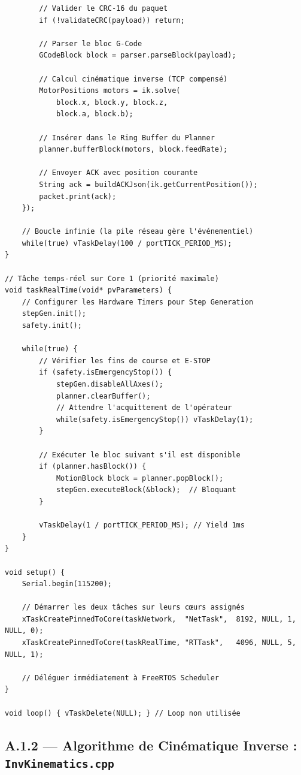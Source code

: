 \begin{tcolorbox}[colback=gray!5, colframe=macouleur, title=\texttt{main.cpp} -- Point d'entrée du firmware ESP32]
\begin{verbatim}
        // Valider le CRC-16 du paquet
        if (!validateCRC(payload)) return;
        
        // Parser le bloc G-Code
        GCodeBlock block = parser.parseBlock(payload);
        
        // Calcul cinématique inverse (TCP compensé)
        MotorPositions motors = ik.solve(
            block.x, block.y, block.z,
            block.a, block.b);
        
        // Insérer dans le Ring Buffer du Planner
        planner.bufferBlock(motors, block.feedRate);
        
        // Envoyer ACK avec position courante
        String ack = buildACKJson(ik.getCurrentPosition());
        packet.print(ack);
    });
    
    // Boucle infinie (la pile réseau gère l'événementiel)
    while(true) vTaskDelay(100 / portTICK_PERIOD_MS);
}

// Tâche temps-réel sur Core 1 (priorité maximale)
void taskRealTime(void* pvParameters) {
    // Configurer les Hardware Timers pour Step Generation
    stepGen.init();
    safety.init();
    
    while(true) {
        // Vérifier les fins de course et E-STOP
        if (safety.isEmergencyStop()) {
            stepGen.disableAllAxes();
            planner.clearBuffer();
            // Attendre l'acquittement de l'opérateur
            while(safety.isEmergencyStop()) vTaskDelay(1);
        }
        
        // Exécuter le bloc suivant s'il est disponible
        if (planner.hasBlock()) {
            MotionBlock block = planner.popBlock();
            stepGen.executeBlock(&block);  // Bloquant
        }
        
        vTaskDelay(1 / portTICK_PERIOD_MS); // Yield 1ms
    }
}

void setup() {
    Serial.begin(115200);
    
    // Démarrer les deux tâches sur leurs cœurs assignés
    xTaskCreatePinnedToCore(taskNetwork,  "NetTask",  8192, NULL, 1, NULL, 0);
    xTaskCreatePinnedToCore(taskRealTime, "RTTask",   4096, NULL, 5, NULL, 1);
    
    // Déléguer immédiatement à FreeRTOS Scheduler
}

void loop() { vTaskDelete(NULL); } // Loop non utilisée
\end{verbatim}
\end{tcolorbox}

\subsection{A.1.2 — Algorithme de Cinématique Inverse : \texttt{InvKinematics.cpp}}

